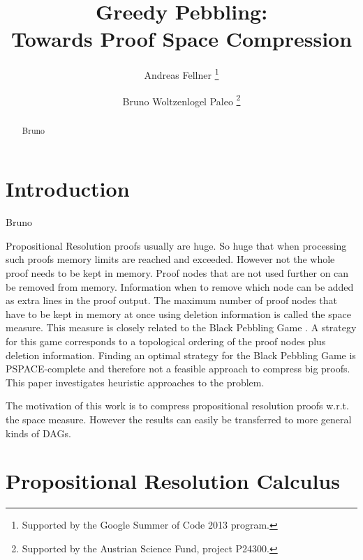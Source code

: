 \documentclass{llncs}
\title{Greedy Pebbling: \\ 
Towards Proof Space Compression}
\author{
  Andreas Fellner 
  \thanks{Supported by the Google Summer of Code 2013 program.}
  \and 
  Bruno Woltzenlogel Paleo 
  \thanks{Supported by the Austrian Science Fund, project P24300.}
}
\institute{
  \email{fellner.a@gmail.com} \ \ \ \email{bruno@logic.at} \\
  Theory and Logic Group \\
  Institute for Computer Languages \\
  Vienna University of Technology
}
\begin{document}
\maketitle

\begin{abstract}
Bruno
\end{abstract}

\setcounter{footnote}{0}


\section{Introduction}
Bruno

Propositional Resolution proofs usually are huge. So huge that when processing such proofs memory limits are reached and exceeded.
However not the whole proof needs to be kept in memory. 
Proof nodes that are not used further on can be removed from memory.
Information when to remove which node can be added as extra lines in the proof output.
The maximum number of proof nodes that have to be kept in memory at once using deletion information is called the space measure.
This measure is closely related to the Black Pebbling Game \cite{kasai1979classes,gilbert1980pebbling}.
A strategy for this game corresponds to a topological ordering of the proof nodes plus deletion information.
Finding an optimal strategy for the Black Pebbling Game is PSPACE-complete \cite{gilbert1980pebbling} and therefore not a feasible approach to compress big proofs.
This paper investigates heuristic approaches to the problem.

The motivation of this work is to compress propositional resolution proofs w.r.t. the space measure. 
However the results can easily be transferred to more general kinds of DAGs.

\section{Propositional Resolution Calculus}
\end{document}
